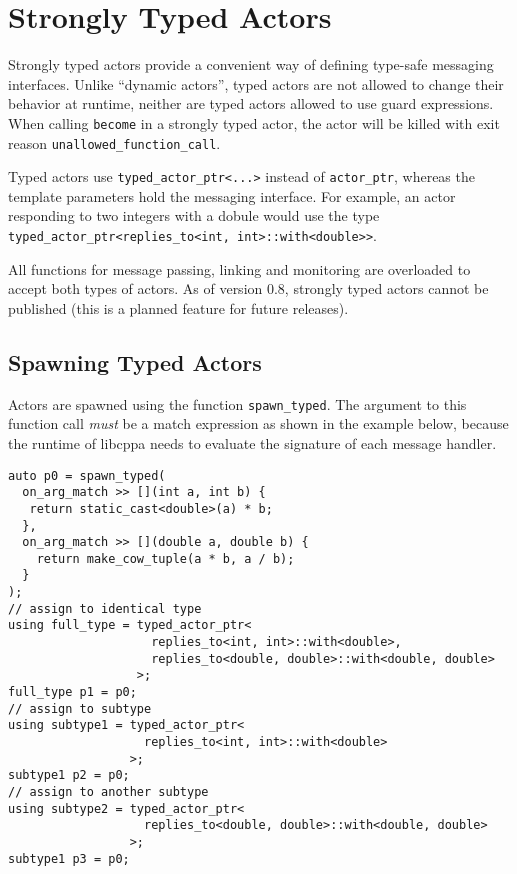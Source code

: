\section{Strongly Typed Actors}

Strongly typed actors provide a convenient way of defining type-safe messaging interfaces.
Unlike ``dynamic actors'', typed actors are not allowed to change their behavior at runtime, neither are typed actors allowed to use guard expressions.
When calling \lstinline^become^ in a strongly typed actor, the actor will be killed with exit reason \lstinline^unallowed_function_call^.

Typed actors use \lstinline^typed_actor_ptr<...>^ instead of \lstinline^actor_ptr^, whereas the template parameters hold the messaging interface.
For example, an actor responding to two integers with a dobule would use the type \lstinline^typed_actor_ptr<replies_to<int, int>::with<double>>^.

All functions for message passing, linking and monitoring are overloaded to accept both types of actors.
As of version 0.8, strongly typed actors cannot be published (this is a planned feature for future releases).

\subsection{Spawning Typed Actors}
\label{sec:strong:spawn}

Actors are spawned using the function \lstinline^spawn_typed^.
The argument to this function call \emph{must} be a match expression as shown in the example below, because the runtime of libcppa needs to evaluate the signature of each message handler.

\begin{lstlisting}
auto p0 = spawn_typed(
  on_arg_match >> [](int a, int b) {
   return static_cast<double>(a) * b;
  },
  on_arg_match >> [](double a, double b) {
    return make_cow_tuple(a * b, a / b);
  }
);
// assign to identical type
using full_type = typed_actor_ptr<
                    replies_to<int, int>::with<double>,
                    replies_to<double, double>::with<double, double>
                  >;
full_type p1 = p0;
// assign to subtype
using subtype1 = typed_actor_ptr<
                   replies_to<int, int>::with<double>
                 >;
subtype1 p2 = p0;
// assign to another subtype
using subtype2 = typed_actor_ptr<
                   replies_to<double, double>::with<double, double>
                 >;
subtype1 p3 = p0;
\end{lstlisting}

